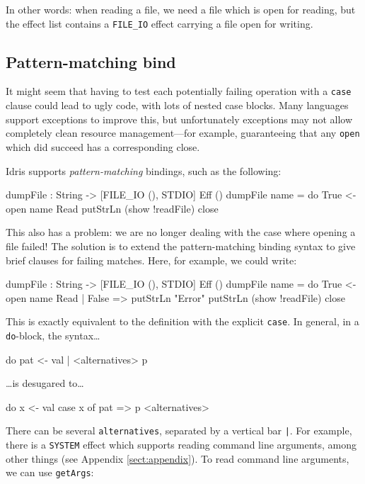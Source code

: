\noindent
In other words: when reading a file, we need a file which is open for reading,
but the effect list contains a \texttt{FILE\_IO} effect carrying a file open
for writing.

\subsection{Pattern-matching bind}

It might seem that having to test each potentially failing operation with
a \texttt{case} clause could lead to ugly code, with lots of nested case
blocks. Many languages support exceptions to improve this, but unfortunately
exceptions may not allow completely clean resource management---for example,
guaranteeing that any \texttt{open} which did succeed has a corresponding close.

Idris supports \emph{pattern-matching} bindings, such as the following:

\begin{code}
dumpFile : String -> { [FILE_IO (), STDIO] } Eff ()
dumpFile name = do True <- open name Read 
                   putStrLn (show !readFile)
                   close
\end{code}

\noindent
This also has a problem: we are no longer dealing with the case where
opening a file failed! The \Idris{} solution is to extend the pattern-matching
binding syntax to give brief clauses for failing matches. Here, for example,
we could write:

\begin{code}
dumpFile : String -> { [FILE_IO (), STDIO] } Eff ()
dumpFile name  = do True <- open name Read | False => putStrLn "Error"
                    putStrLn (show !readFile)
                    close
\end{code}

\noindent
This is exactly equivalent to the definition with the explicit \texttt{case}.
In general, in a \texttt{do}-block, the syntax\ldots

\begin{code}
do pat <- val | <alternatives>
   p
\end{code}

\ldots is desugared to\ldots

\begin{code}
do x <- val
   case x of
        pat => p
        <alternatives>
\end{code}

\noindent
There can be several \texttt{alternatives}, separated by a vertical bar
\texttt{|}. For example, there is a \texttt{SYSTEM} effect which supports
reading command line arguments, among other things (see Appendix
\ref{sect:appendix}). To read command
line arguments, we can use \texttt{getArgs}:

